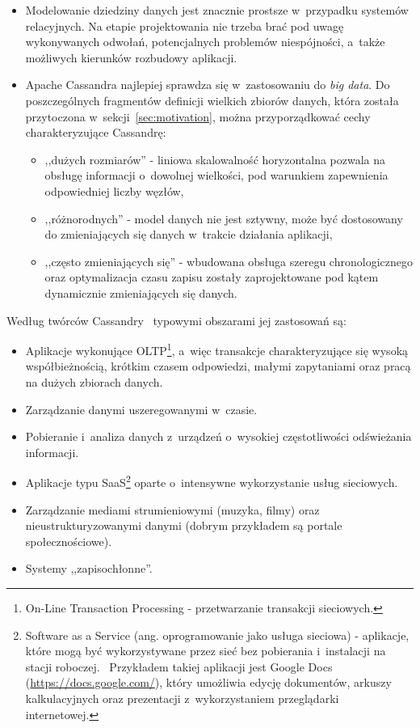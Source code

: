 \begin{itemize}
	\item Modelowanie dziedziny danych jest znacznie prostsze w~przypadku systemów relacyjnych. Na etapie projektowania nie trzeba brać pod uwagę wykonywanych odwołań, potencjalnych problemów niespójności, a~także możliwych kierunków rozbudowy aplikacji.
	\item Apache Cassandra najlepiej sprawdza się w~zastosowaniu do \emph{big data}. Do poszczególnych fragmentów definicji wielkich zbiorów danych, która została przytoczona w~sekcji~\ref{sec:motivation}, można przyporządkować cechy charakteryzujące Cassandrę:
		\begin{itemize}
			\item ,,dużych rozmiarów'' - liniowa skalowalność horyzontalna pozwala na obsługę informacji o~dowolnej wielkości, pod warunkiem zapewnienia odpowiedniej liczby węzłów,
			\item ,,różnorodnych'' - model danych nie jest sztywny, może być dostosowany do zmieniających się danych w~trakcie działania aplikacji,
			\item ,,często zmieniających się'' - wbudowana obsługa szeregu chronologicznego oraz optymalizacja czasu zapisu zostały zaprojektowane pod kątem dynamicznie zmieniających się danych. 
		\end{itemize}
\end{itemize}

Według twórców Cassandry~\cite{why_migrate_from_mysql} typowymi obszarami jej zastosowań są:
	\begin{itemize}
		\item Aplikacje wykonujące OLTP\footnote{On-Line Transaction Processing - przetwarzanie transakcji sieciowych.}, a~więc transakcje charakteryzujące się wysoką współbieżnością, krótkim czasem odpowiedzi, małymi zapytaniami oraz pracą na dużych zbiorach danych.~\cite{oltp_definition}
		\item Zarządzanie danymi uszeregowanymi w~czasie.
		\item Pobieranie i~analiza danych z~urządzeń o~wysokiej częstotliwości odświeżania informacji.
		\item Aplikacje typu SaaS\footnote{Software as a Service (ang. oprogramowanie jako usługa sieciowa) - aplikacje, które mogą być wykorzystywane przez sieć bez pobierania i~instalacji na stacji roboczej.~\cite{saas_definition} Przykładem takiej aplikacji jest Google Docs (\url{https://docs.google.com/}), który umożliwia edycję dokumentów, arkuszy kalkulacyjnych oraz prezentacji z~wykorzystaniem przeglądarki internetowej.} oparte o~intensywne wykorzystanie usług sieciowych.
		\item Zarządzanie mediami strumieniowymi (muzyka, filmy) oraz nieustrukturyzowanymi danymi (dobrym przykładem są portale społecznościowe).
		\item Systemy ,,zapisochłonne''.
	\end{itemize}

